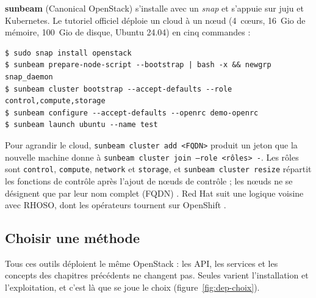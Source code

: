 \textbf{\gls{sunbeam}} (Canonical OpenStack) s'installe avec un \emph{snap} et s'appuie sur \gls{juju} et Kubernetes. Le tutoriel officiel
déploie un cloud à un nœud (4~cœurs, 16~Gio de mémoire, 100~Gio de disque, Ubuntu 24.04) en cinq commandes \parencite{sunbeam-tuto} :

\par\noindent\begin{minipage}{\linewidth}
\begin{lstlisting}[style=terminal]
$ sudo snap install openstack
$ sunbeam prepare-node-script --bootstrap | bash -x && newgrp snap_daemon
$ sunbeam cluster bootstrap --accept-defaults --role control,compute,storage
$ sunbeam configure --accept-defaults --openrc demo-openrc
$ sunbeam launch ubuntu --name test
\end{lstlisting}
\end{minipage}\par

Pour agrandir le cloud, \texttt{sunbeam cluster add <FQDN>} produit un jeton que la nouvelle machine donne à
\texttt{sunbeam cluster join --role <rôles> -}. Les rôles sont \texttt{control}, \texttt{compute}, \texttt{network} et
\texttt{storage}, et \texttt{sunbeam cluster resize} répartit les fonctions de contrôle après l'ajout de nœuds de contrôle ;
les nœuds ne se désignent que par leur nom complet (FQDN) \parencite{sunbeam-multinode}. Red Hat suit une logique voisine avec
RHOSO, dont les opérateurs tournent sur OpenShift \parencite{rhoso-deploy}.

\subsection{Choisir une méthode}\label{sec:dep-choix}

Tous ces outils déploient le même OpenStack : les API, les services et les concepts des chapitres précédents ne changent pas. Seules
varient l'installation et l'exploitation, et c'est là que se joue le choix (figure~\ref{fig:dep-choix}).

